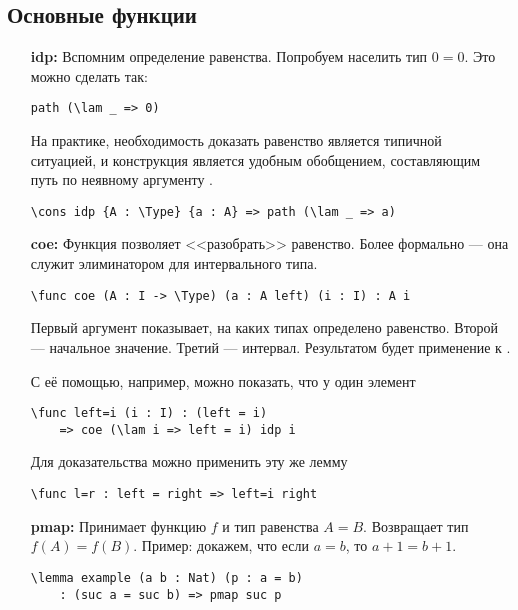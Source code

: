 \subsection{Основные функции}
\begin{itemize}
\item [\bf idp:] Вспомним определение равенства. Попробуем населить тип $0 = 0$. Это можно сделать так:

\begin{verbatim}
path (\lam _ => 0)
\end{verbatim}

На практике, необходимость доказать равенство является типичной ситуацией, и конструкция 
является удобным обобщением, составляющим путь по неявному аргументу .

\begin{verbatim}
\cons idp {A : \Type} {a : A} => path (\lam _ => a)
\end{verbatim}

\item [\bf coe:] Функция  позволяет <<разобрать>> равенство. Более формально --- она служит элиминатором для интервального типа.

\begin{verbatim}
\func coe (A : I -> \Type) (a : A left) (i : I) : A i
\end{verbatim}


Первый аргумент показывает, на каких типах определено равенство. Второй --- начальное значение. Третий --- интервал.
Результатом будет применение  к .

С её помощью, например, можно показать, что у  один элемент

\begin{verbatim}
\func left=i (i : I) : (left = i)
    => coe (\lam i => left = i) idp i
\end{verbatim}

Для доказательства  можно применить эту же лемму

\begin{verbatim}
\func l=r : left = right => left=i right
\end{verbatim}

\item [\bf pmap:] Принимает функцию $f$ и тип равенства $A = B$. Возвращает тип $f(A) = f(B)$.
Пример: докажем, что если $a = b$, то $a+1 = b+1$.
\begin{verbatim}
\lemma example (a b : Nat) (p : a = b) 
    : (suc a = suc b) => pmap suc p
\end{verbatim}


\end{itemize}
